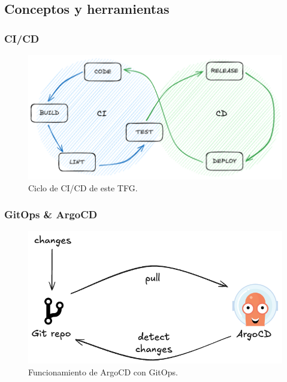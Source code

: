 \documentclass{beamer}
\begin{document}
\subsection{Conceptos y herramientas}
\begin{frame}
    \frametitle{CI/CD}
    \begin{figure}
        \includegraphics[scale=0.35]{figuras/ci_cd}
        \caption{Ciclo de CI/CD de este TFG.}
    \end{figure}
\end{frame}
\begin{frame}
    \frametitle{GitOps \& ArgoCD}
    \begin{figure}
        \includegraphics[scale=0.35]{figuras/argocd-simple}
        \caption{Funcionamiento de ArgoCD con GitOps.}
    \end{figure}
\end{frame}
\end{document}
